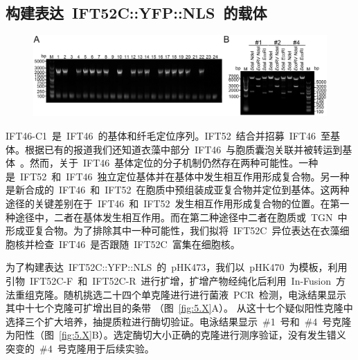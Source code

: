\subsection{构建表达\ IFT52C::YFP::NLS\ 的载体}
\begin{figure}[ht]
\centering
\graphicspath{{figures/}}
\includegraphics[width=\textwidth]{fig5-X.jpg}
{
\par}
\end{figure}

IFT46-C1\ 是\ IFT46\ 的基体和纤毛定位序列。IFT52\ 结合并招募\ IFT46\ 至基体。根据已有的报道我们还知道衣藻中部分\ IFT46\ 与胞质囊泡关联并被转运到基体\ \citep{Wood2014}。然而，关于\ IFT46\ 基体定位的分子机制仍然存在两种可能性。一种是\ IFT52\ 和\ IFT46\ 独立定位基体并在基体中发生相互作用形成复合物。另一种是新合成的\ IFT46\ 和\ IFT52\ 在胞质中预组装成亚复合物并定位到基体。这两种途径的关键差别在于\ IFT46\ 和\ IFT52\ 发生相互作用形成复合物的位置。在第一种途径中，二者在基体发生相互作用。而在第二种途径中二者在胞质或\ TGN\ 中形成亚复合物。为了排除其中一种可能性，我们拟将\ IFT52C\ 异位表达在衣藻细胞核并检查\ IFT46\ 是否跟随\ IFT52C\ 富集在细胞核。

为了构建表达\ IFT52C::YFP::NLS\ 的\ pHK473，我们以\ pHK470\ 为模板，利用引物\ IFT52C-F\ 和\ IFT52C-R\ 进行扩增，扩增产物经纯化后利用\ In-Fusion\ 方法重组克隆。随机挑选二十四个单克隆进行进行菌液\ PCR\ 检测，电泳结果显示其中十七个克隆可扩增出目的条带
（图\ \ref{fig:5.X}A）。 从这十七个疑似阳性克隆中选择三个扩大培养，抽提质粒进行酶切验证。电泳结果显示\ \#1\ 号和\ \#4\ 号克隆为阳性（图\ \ref{fig:5.X}B）。选定酶切大小正确的克隆进行测序验证，没有发生错义突变的\ \#4\ 号克隆用于后续实验。

